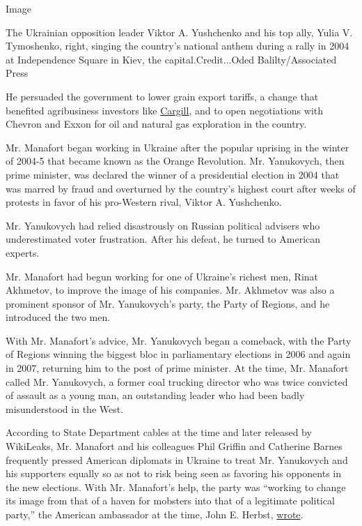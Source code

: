 Image

The Ukrainian opposition leader Viktor A. Yushchenko and his top ally,
Yulia V. Tymoshenko, right, singing the country's national anthem during
a rally in 2004 at Independence Square in Kiev, the
capital.Credit...Oded Balilty/Associated Press

He persuaded the government to lower grain export tariffs, a change that
benefited agribusiness investors like
\href{http://www.cargill.com/worldwide/ukraine/index.jsp}{Cargill}, and
to open negotiations with Chevron and Exxon for oil and natural gas
exploration in the country.

Mr. Manafort began working in Ukraine after the popular uprising in the
winter of 2004-5 that became known as the Orange Revolution. Mr.
Yanukovych, then prime minister, was declared the winner of a
presidential election in 2004 that was marred by fraud and overturned by
the country's highest court after weeks of protests in favor of his
pro-Western rival, Viktor A. Yushchenko.

Mr. Yanukovych had relied disastrously on Russian political advisers who
underestimated voter frustration. After his defeat, he turned to
American experts.

Mr. Manafort had begun working for one of Ukraine's richest men, Rinat
Akhmetov, to improve the image of his companies. Mr. Akhmetov was also a
prominent sponsor of Mr. Yanukovych's party, the Party of Regions, and
he introduced the two men.

With Mr. Manafort's advice, Mr. Yanukovych began a comeback, with the
Party of Regions winning the biggest bloc in parliamentary elections in
2006 and again in 2007, returning him to the post of prime minister. At
the time, Mr. Manafort called Mr. Yanukovych, a former coal trucking
director who was twice convicted of assault as a young man, an
outstanding leader who had been badly misunderstood in the West.

According to State Department cables at the time and later released by
WikiLeaks, Mr. Manafort and his colleagues Phil Griffin and Catherine
Barnes frequently pressed American diplomats in Ukraine to treat Mr.
Yanukovych and his supporters equally so as not to risk being seen as
favoring his opponents in the new elections. With Mr. Manafort's help,
the party was ``working to change its image from that of a haven for
mobsters into that of a legitimate political party,'' the American
ambassador at the time, John E. Herbst,
\href{https://wikileaks.org/plusd/cables/06KIEV473_a.html}{wrote}.


